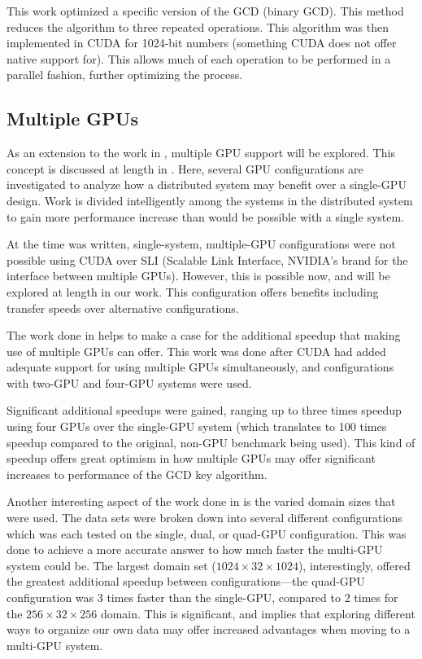 \documentclass[smallextended]{svjour3}       %
\begin{document}
This work optimized a specific version of the GCD (binary GCD). This method
reduces the algorithm to three repeated operations. This algorithm was then
implemented in CUDA for 1024-bit numbers (something CUDA does not offer native
support for). This allows much of each operation to be performed in a parallel
fashion, further optimizing the process.

\subsection{Multiple GPUs}
\label{subsec:muliGPU}
As an extension to the work in \cite{scharfglass2012breaking}, multiple GPU
support will be explored. This concept is discussed at length in
\cite{schaa2009exploring}. Here, several GPU configurations are investigated to
analyze how a distributed system may benefit over a single-GPU design.
Work is divided intelligently among the systems in the distributed system to
gain more performance increase than would be possible with a single system.

At the time \cite{schaa2009exploring} was written, single-system,
multiple-GPU configurations were not possible using CUDA over SLI (Scalable
Link Interface, NVIDIA's brand for the interface between multiple GPUs).
However, this is possible now, and will be explored at length in our work.
This configuration offers benefits including transfer speeds over alternative
configurations.

The work done in \cite{thibault2009cuda} helps to make a case for the
additional speedup that making use of multiple GPUs can offer. This work was
done after CUDA had added adequate support for using multiple GPUs
simultaneously, and configurations with two-GPU and four-GPU systems were used.

Significant additional speedups were gained, ranging up to three times speedup
using four GPUs over the single-GPU system (which translates to 100 times
speedup compared to the original, non-GPU benchmark being used). This kind of
speedup offers great optimism in how multiple GPUs may offer significant
increases to performance of the GCD key algorithm.

Another interesting aspect of the work done in \cite{thibault2009cuda} is the
varied domain sizes that were used. The data sets were broken down into several
different configurations which was each tested on the single, dual, or quad-GPU
configuration. This was done to achieve a more accurate answer to how much
faster the multi-GPU system could be. The largest domain set
($1024\times32\times1024$), interestingly, offered the greatest additional
speedup between configurations---the quad-GPU configuration was 3 times faster
than the single-GPU, compared to 2 times for the $256\times32\times256$
domain. This is significant, and implies that exploring different ways to
organize our own data may offer increased advantages when moving to a multi-GPU
system.
\end{document}

